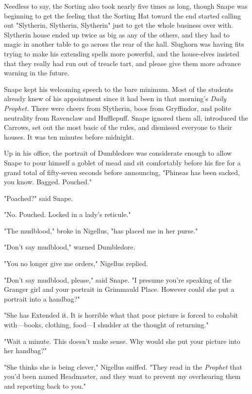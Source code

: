 Needless to say, the Sorting also took nearly five times as long, though Snape was beginning to get the feeling that the Sorting Hat toward the end started calling out "Slytherin, Slytherin, Slytherin{\el}" just to get the whole business over with. Slytherin house ended up twice as big as any of the others, and they had to magic in another table to go across the rear of the hall. Slughorn was having fits trying to make his extending spells more powerful, and the house-elves insisted that they really had run out of treacle tart, and please give them more advance warning in the future.

Snape kept his welcoming speech to the bare minimum. Most of the students already knew of his appointment since it had been in that morning's \emph{Daily Prophet.} There were cheers from Slytherin, boos from Gryffindor, and polite neutrality from Ravenclaw and Hufflepuff. Snape ignored them all, introduced the Carrows, set out the most basic of the rules, and dismissed everyone to their houses. It was ten minutes before midnight.

Up in his office, the portrait of Dumbledore was considerate enough to allow Snape to pour himself a goblet of mead and sit comfortably before his fire for a grand total of fifty-seven seconds before announcing, "Phineas has been sacked, you know. Bagged. Pouched."

"Poached?" said Snape.

"No. Pouched. Locked in a lady's reticule."

"The mudblood," broke in Nigellus, "has placed me in her purse."

"Don't say mudblood," warned Dumbledore.

"You no longer give me orders," Nigellus replied.

"Don't say mudblood, please," said Snape. "I presume you're speaking of the Granger girl and your portrait in Grimmauld Place. However could she put a portrait into a handbag?"

"She has Extended it. It is horrible what that poor picture is forced to cohabit with—books, clothing, food—I shudder at the thought of returning."

"Wait a minute. This doesn't make sense. Why would she put your picture into her handbag?"

"She thinks she is being clever," Nigellus sniffed. "They read in the \emph{Prophet} that you'd been named Headmaster, and they want to prevent my overhearing them and reporting back to you."

